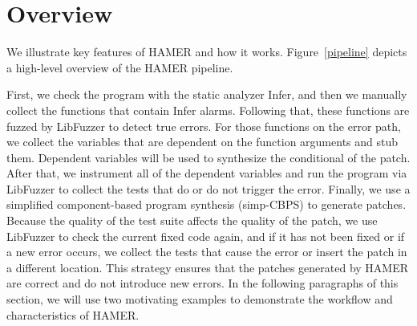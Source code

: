 \documentclass[a4paper,11pt,oneside,openany]{book}
\begin{document}

\chapter{Overview}
\label{overview}
We illustrate key features of HAMER and how it works. Figure~\ref{pipeline} depicts a high-level overview of the HAMER pipeline.

First, we check the program with the static analyzer \mbox{Infer}, and then we manually collect the functions that contain Infer alarms. Following that, these functions are fuzzed by LibFuzzer to detect true errors.  For those functions on the error path, we collect the variables that are dependent on the function arguments and stub them. Dependent variables will be used to synthesize the conditional of the patch. After that, we instrument all of the dependent variables and run the program via LibFuzzer to collect the tests that do or do not trigger the error. Finally, we use a simplified component-based program synthesis (simp-CBPS) to generate patches. Because the quality of the test suite affects the quality of the patch, we use LibFuzzer to check the current fixed code again, and if it has not been fixed or if a new error occurs, we collect the tests that cause the error or insert the patch in a different location. This strategy ensures that the patches generated by HAMER are correct and do not introduce new errors. In the following paragraphs of this section, we will use two motivating examples to demonstrate the workflow and characteristics of HAMER.
\end{document}
